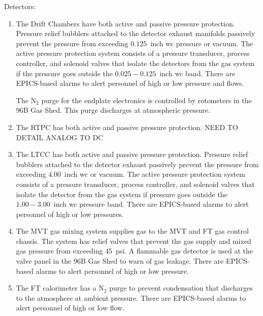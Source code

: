 \noindent
Detectors:
\begin{enumerate}
\item The Drift Chambers have both active and passive pressure protection. Pressure relief 
bubblers attached to the detector exhaust manifolds passively prevent the pressure from 
exceeding $0.125$~inch wc pressure or vacuum. The active pressure protection system consists 
of a pressure transducer, process controller, and solenoid valves that isolate the detectors 
from the gas system if the pressure goes outside the $0.025-0.125$~inch wc band. There are 
EPICS-based alarms to alert personnel of high or low pressure and flows.

The N$_2$ purge for the endplate electronics is controlled by rotometers in the 96B Gas Shed. 
This purge discharges at atmospheric pressure.

\item The RTPC has both active and passive pressure protection. NEED TO DETAIL ANALOG TO DC

\item The LTCC has both active and passive pressure protection. Pressure relief bubblers 
attached to the detector exhaust passively prevent the pressure from exceeding $4.00$~inch wc 
or vacuum. The active pressure protection system consists of a pressure transducer, process 
controller, and solenoid valves that isolate the detector from the gas system if pressure goes 
outside the $1.00 - 3.00$~inch wc pressure band. There are EPICS-based alarms to alert 
personnel of high or low pressures.
	

\item The MVT gas mixing system supplies gas to the MVT and FT gas control chassis. The system 
has relief valves that prevent the gas supply and mixed gas pressure from exceeding $45$~psi. 
A flammable gas detector is used at the valve panel in the 96B Gas Shed to warn of gas leakage. 
There are EPICS-based alarms to alert personnel of high or low pressure.

\item The FT calorimeter has a N$_2$ purge to prevent condensation that discharges to the 
atmosphere at ambient pressure. There are EPICS-based alarms to alert personnel of high or low 
flow.


\end{enumerate}
